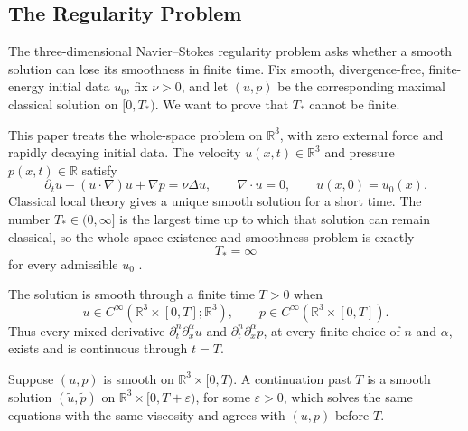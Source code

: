 \subsection{The Regularity Problem}\label{sub:TheRegularityProblem}

The three-dimensional Navier--Stokes regularity problem asks whether a smooth solution can lose its smoothness in finite time.
Fix smooth, divergence-free, finite-energy initial data \(u_0\), fix \(\nu>0\), and let \((u,p)\) be the corresponding maximal classical solution on \([0,T_*)\).
We want to prove that \(T_*\) cannot be finite.

This paper treats the whole-space problem on \(\mathbb R^3\), with zero external force and rapidly decaying initial data.
The velocity \(u(x,t)\in\mathbb R^3\) and pressure \(p(x,t)\in\mathbb R\) satisfy
\[
  \partial_tu+(u\cdot\nabla)u+\nabla p
  =
  \nu\Delta u,
  \qquad
  \nabla\cdot u=0,
  \qquad
  u(x,0)=u_0(x).
\]
Classical local theory gives a unique smooth solution for a short time.
The number \(T_*\in(0,\infty]\) is the largest time up to which that solution can remain classical, so the whole-space existence-and-smoothness problem is exactly
\[
  T_*=\infty
\]
for every admissible \(u_0\) \parencite{Fefferman2000}.


\begin{definition}[Smoothness]\label{def:Smoothness}
The solution is smooth through a finite time \(T>0\) when
\[
  u\in C^\infty\!\left(\mathbb R^3\times[0,T];\mathbb R^3\right),
  \qquad
  p\in C^\infty\!\left(\mathbb R^3\times[0,T]\right).
\]
Thus every mixed derivative \(\partial_t^n\partial_x^\alpha u\) and \(\partial_t^n\partial_x^\alpha p\), at every finite choice of \(n\) and \(\alpha\), exists and is continuous through \(t=T\).
\end{definition}


\begin{definition}[Continuation]\label{def:Continuation}
Suppose \((u,p)\) is smooth on \(\mathbb R^3\times[0,T)\).
A continuation past \(T\) is a smooth solution \((\widetilde u,\widetilde p)\) on \(\mathbb R^3\times[0,T+\varepsilon)\), for some \(\varepsilon>0\), which solves the same equations with the same viscosity and agrees with \((u,p)\) before \(T\).
\end{definition}

